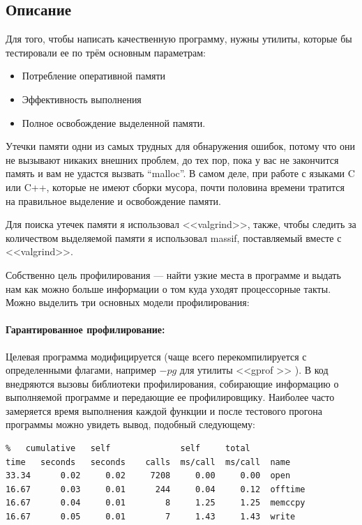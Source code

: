 \documentclass[12pt]{article}
\begin{document}
\subsection*{Описание}

Для того, чтобы написать качественную программу, нужны утилиты, которые бы тестировали ее по трём основным параметрам:
\begin{itemize}
\item  Потребление оперативной памяти

\item Эффективность выполнения 
 
\item  Полное освобождение выделенной памяти.

\end{itemize}

Утечки памяти одни из самых трудных для обнаружения ошибок, потому что они не вызывают никаких внешних проблем, до тех пор, пока у вас не закончится память и вам не удастся вызвать ``malloc''. В самом деле, при работе с языками C или C++, которые не имеют сборки мусора, почти половина времени тратится на правильное выделение и освобождение памяти.


Для поиска утечек памяти я использовал <<valgrind>>, также, чтобы следить за количеством выделяемой памяти я использовал massif, поставляемый вместе с <<valgrind>>.


Собственно цель профилирования --- найти узкие места в программе и выдать нам как можно больше информации о том куда уходят процессорные такты. Можно выделить три основных модели профилирования:

\paragraph*{Гарантированное профилирование:} 

Целевая программа модифицируется (чаще всего перекомпилируется с определенными флагами, например $-pg$ для утилиты <<gprof >> ). В код внедряются вызовы библиотеки профилирования, собирающие информацию о выполняемой программе и передающие ее профилировщику. Наиболее часто замеряется время выполнения каждой функции и после тестового прогона программы можно увидеть вывод, подобный следующему:
\begin{lstlisting}
%   cumulative   self              self     total
time   seconds   seconds    calls  ms/call  ms/call  name
33.34      0.02     0.02     7208     0.00     0.00  open
16.67      0.03     0.01      244     0.04     0.12  offtime
16.67      0.04     0.01        8     1.25     1.25  memccpy
16.67      0.05     0.01        7     1.43     1.43  write
\end{lstlisting}
\end{document}
